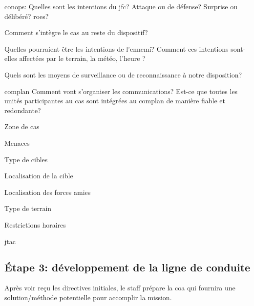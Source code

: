 \begin{e1}
	
	\begin{e2}
		\item \gls{conops}: Quelles sont les intentions du \gls{jfc}? Attaque ou de défense? Surprise ou délibéré? \glspl{roe}?
		\item Comment s'intègre le \gls{cas} au reste du dispositif?
		\item Quelles pourraient être les intentions de l'ennemi? Comment ces intentions sont-elles affectées par le terrain, la météo, l'heure ?
		\item Quels sont les moyens de surveillance ou de reconnaissance à notre disposition?
		\item \gls{complan} Comment vont s'organiser les communications? Est-ce que toutes les unités participantes au \gls{cas} sont intégrées au \gls{complan}  de manière fiable et redondante?
	\end{e2}
	
	
	\begin{e2}
		\item Zone de \gls{cas}
		\item Menaces
		\item Type de cibles
		\item Localisation de la cible
		\item Localisation des forces amies
		\item Type de terrain
		\item Restrictions horaires
		\item \gls{jtac}
	\end{e2}
\end{e1}

\subsection{Étape 3: développement de la ligne de conduite}

Après voir reçu les directives initiales, le staff prépare la \gls{coa} qui fournira une solution/méthode potentielle pour accomplir la mission.

